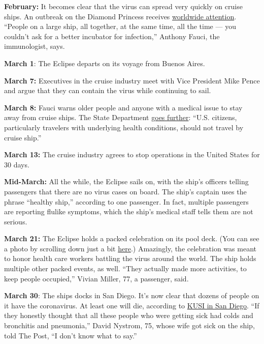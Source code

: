 \textbf{February:} It becomes clear that the virus can spread very
quickly on cruise ships. An outbreak on the Diamond Princess receives
\href{https://www.nytimes3xbfgragh.onion/2020/02/22/world/asia/coronavirus-japan-cruise-ship.html}{worldwide
attention}. ``People on a large ship, all together, at the same time,
all the time --- you couldn't ask for a better incubator for
infection,'' Anthony Fauci, the immunologist, says.

\textbf{March 1}: The Eclipse departs on its voyage from Buenos Aires.

\textbf{March 7:} Executives in the cruise industry meet with Vice
President Mike Pence and argue that they can contain the virus while
continuing to sail.

\textbf{March 8:} Fauci warns older people and anyone with a medical
issue to stay away from cruise ships. The State Department
\href{https://travel.state.gov/content/travel/en/international-travel/before-you-go/travelers-with-special-considerations/cruise-ship-passengers.html?fbclid=IwAR23mRlu4-382HLuSM8i0KWQBSaZ4heDniggmxR3kBR6e2EgWiKr6B0EseM\#.XmVnwRnDlCU.twitter}{goes
further}: ``U.S. citizens, particularly travelers with underlying health
conditions, should not travel by cruise ship.''

\textbf{March 13:} The cruise industry agrees to stop operations in the
United States for 30 days.

\textbf{Mid-March:} All the while, the Eclipse sails on, with the ship's
officers telling passengers that there are no virus cases on board. The
ship's captain uses the phrase ``healthy ship,'' according to one
passenger. In fact, multiple passengers are reporting flulike symptoms,
which the ship's medical staff tells them are not serious.

\textbf{March 21:} The Eclipse holds a packed celebration on its pool
deck. (You can see a photo by scrolling down just a bit
\href{https://www.washingtonpost.com/graphics/2020/politics/cruise-ships-coronavirus/?nid=top_pb_signin}{here}.)
Amazingly, the celebration was meant to honor health care workers
battling the virus around the world. The ship holds multiple other
packed events, as well. ``They actually made more activities, to keep
people occupied,'' Vivian Miller, 77, a passenger, said.

\textbf{March 30}: The ships docks in San Diego. It's now clear that
dozens of people on it have the coronavirus. At least one will die,
according to
\href{https://www.kusi.com/sister-of-celebrity-cruise-ship-eclipse-passenger-who-died-from-covid-19-speaks-about-how-it-was-handled/}{KUSI
in San Diego}. ``If they honestly thought that all these people who were
getting sick had colds and bronchitis and pneumonia,'' David Nystrom,
75, whose wife got sick on the ship, told The Post, ``I don't know what
to say.''


